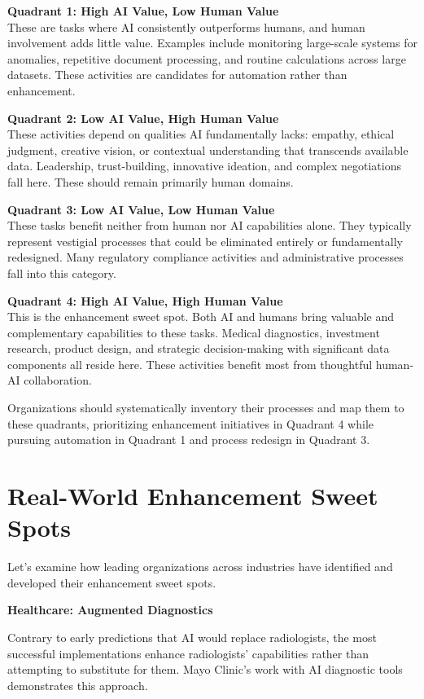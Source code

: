 \documentclass[
  Letterpaper,
]{scrbook}
\begin{document}
\textbf{Quadrant 1: High AI Value, Low Human Value}\\
These are tasks where AI consistently outperforms humans, and human
involvement adds little value. Examples include monitoring large-scale
systems for anomalies, repetitive document processing, and routine
calculations across large datasets. These activities are candidates for
automation rather than enhancement.

\textbf{Quadrant 2: Low AI Value, High Human Value}\\
These activities depend on qualities AI fundamentally lacks: empathy,
ethical judgment, creative vision, or contextual understanding that
transcends available data. Leadership, trust-building, innovative
ideation, and complex negotiations fall here. These should remain
primarily human domains.

\textbf{Quadrant 3: Low AI Value, Low Human Value}\\
These tasks benefit neither from human nor AI capabilities alone. They
typically represent vestigial processes that could be eliminated
entirely or fundamentally redesigned. Many regulatory compliance
activities and administrative processes fall into this category.

\textbf{Quadrant 4: High AI Value, High Human Value}\\
This is the enhancement sweet spot. Both AI and humans bring valuable
and complementary capabilities to these tasks. Medical diagnostics,
investment research, product design, and strategic decision-making with
significant data components all reside here. These activities benefit
most from thoughtful human-AI collaboration.

Organizations should systematically inventory their processes and map
them to these quadrants, prioritizing enhancement initiatives in
Quadrant 4 while pursuing automation in Quadrant 1 and process redesign
in Quadrant 3.

\section{Real-World Enhancement Sweet
Spots}\label{real-world-enhancement-sweet-spots}

Let's examine how leading organizations across industries have
identified and developed their enhancement sweet spots.

\textbf{Healthcare: Augmented Diagnostics}

Contrary to early predictions that AI would replace radiologists, the
most successful implementations enhance radiologists' capabilities
rather than attempting to substitute for them. Mayo Clinic's work with
AI diagnostic tools demonstrates this approach.
\end{document}

